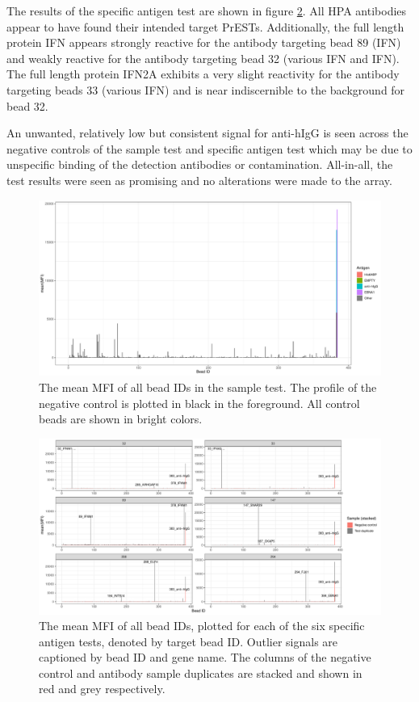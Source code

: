 \documentclass{article}
\begin{document}
The results of the specific antigen test are shown in figure \ref{specifig}. All HPA antibodies appear to have found their intended target PrESTs. Additionally, the full length protein IFN\textomega{} appears strongly reactive for the antibody targeting bead 89 (IFN\textomega) and weakly reactive for the antibody targeting bead 32 (various IFN\textalpha{} and IFN\textomega{}). The full length protein IFN\textalpha2A exhibits a very slight reactivity for the antibody targeting beads 33 (various IFN\textalpha) and is near indiscernible to the background for bead 32.

An unwanted, relatively low but consistent signal for anti-hIgG is seen across the negative controls of the sample test and specific antigen test which may be due to unspecific binding of the detection antibodies or contamination. All-in-all, the test results were seen as promising and no alterations were made to the array.

\begin{figure}[H]
	\centering
	\includegraphics[width=\linewidth]{figures/sample.pdf}
	\caption{The mean MFI of all bead IDs in the sample test. The profile of the negative control is plotted in black in the foreground. All control beads are shown in bright colors.}
	\label{fig_sample_test}
\end{figure}
\begin{figure}[H]
	\centering
	\includegraphics[width=\linewidth]{figures/specific.pdf}
	\caption{The mean MFI of all bead IDs, plotted for each of the six specific antigen tests, denoted by target bead ID. Outlier signals are captioned by bead ID and gene name. The columns of the negative control and antibody sample duplicates are stacked and shown in red and grey respectively.}
	\label{specifig}
\end{figure}
\end{document}
